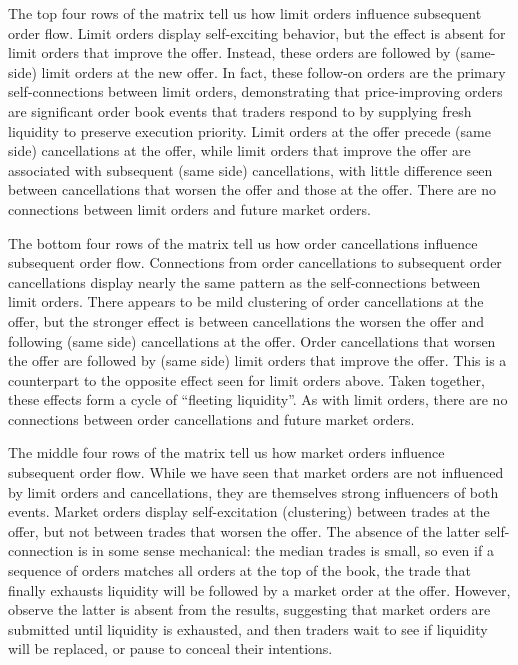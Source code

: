 		The top four rows of the matrix tell us how limit orders influence subsequent order flow. Limit orders display self-exciting behavior, but the effect is absent for limit orders that improve the offer. Instead, these orders are followed by (same-side) limit orders at the new offer. In fact, these follow-on orders  are the primary self-connections between limit orders, demonstrating that price-improving orders are significant order book events that traders respond to by supplying fresh liquidity to preserve execution priority. Limit orders at the offer precede (same side) cancellations at the offer, while limit orders that improve the offer are associated with subsequent (same side) cancellations, with little difference seen between cancellations that worsen the offer and those at the offer. There are no connections between limit orders and future market orders.

		The bottom four rows of the matrix tell us how order cancellations influence subsequent order flow. Connections from order cancellations to subsequent order cancellations display nearly the same pattern as the self-connections between limit orders. There appears to be mild clustering of order cancellations at the offer, but the stronger effect is between cancellations the worsen the offer and following (same side) cancellations at the offer. Order cancellations that worsen the offer are followed by (same side) limit orders that improve the offer. This is a counterpart to the opposite effect seen for limit orders above. Taken together, these effects form a cycle of ``fleeting liquidity''. As with limit orders, there are no connections between order cancellations and future market orders.

		The middle four rows of the matrix tell us how market orders influence subsequent order flow. While  we have seen that market orders are not influenced by limit orders and cancellations, they are themselves strong influencers of both events. Market orders display self-excitation (clustering) between trades at the offer, but not between trades that worsen the offer. The absence of the latter self-connection is in some sense mechanical: the median trades is small, so even if a sequence of orders matches all orders at the top of the book, the trade that finally exhausts liquidity will be followed by a market order at the offer. However, observe the latter is absent from the results, suggesting that market orders are submitted until liquidity is exhausted, and then traders wait to see if liquidity will be replaced, or pause to conceal their intentions.

